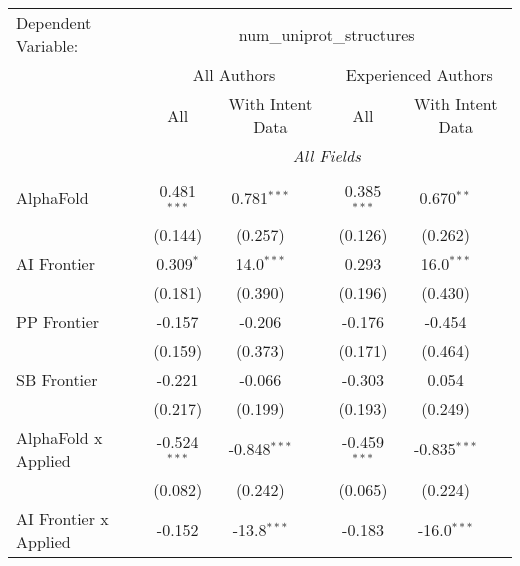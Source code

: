 \begingroup
\centering
\begin{tabular}{lcccccc}
   \tabularnewline \midrule \midrule
   Dependent Variable: & \multicolumn{6}{c}{num\_uniprot\_structures}\\
 & \multicolumn{3}{c}{All Authors} & \multicolumn{3}{c}{Experienced Authors} \\
\cmidrule(lr){2-4} \cmidrule(lr){5-7}
 & \multicolumn{1}{c}{All} & \multicolumn{2}{c}{With Intent Data} & \multicolumn{1}{c}{All} & \multicolumn{2}{c}{With Intent Data} \\
\cmidrule(lr){2-2} \cmidrule(lr){3-4} \cmidrule(lr){5-5} \cmidrule(lr){6-7}
 & \multicolumn{6}{c}{\textit{All Fields}} \\ \\
   AlphaFold                      & 0.481$^{***}$  & 0.781$^{***}$  &                & 0.385$^{***}$  & 0.670$^{**}$   &   \\   
                                  & (0.144)        & (0.257)        &                & (0.126)        & (0.262)        &   \\   
   AI Frontier                    & 0.309$^{*}$    & 14.0$^{***}$   &                & 0.293          & 16.0$^{***}$   &   \\   
                                  & (0.181)        & (0.390)        &                & (0.196)        & (0.430)        &   \\   
   PP Frontier                    & -0.157         & -0.206         &                & -0.176         & -0.454         &   \\   
                                  & (0.159)        & (0.373)        &                & (0.171)        & (0.464)        &   \\   
   SB Frontier                    & -0.221         & -0.066         &                & -0.303         & 0.054          &   \\   
                                  & (0.217)        & (0.199)        &                & (0.193)        & (0.249)        &   \\   
   AlphaFold x Applied            & -0.524$^{***}$ & -0.848$^{***}$ &                & -0.459$^{***}$ & -0.835$^{***}$ &   \\   
                                  & (0.082)        & (0.242)        &                & (0.065)        & (0.224)        &   \\   
   AI Frontier x Applied          & -0.152         & -13.8$^{***}$  &                & -0.183         & -16.0$^{***}$  &   \\   

\end{tabular}
